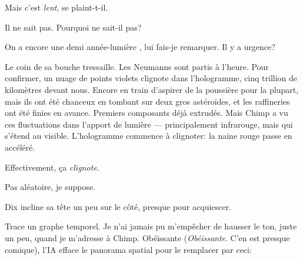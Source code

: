 \og Mais c'est \emph{lent}\fg , se plaint-t-il.

Il ne sait pas. Pourquoi ne sait-il pas?

\og On a encore une demi année-lumière \fg , lui fais-je remarquer. \og Il y a urgence?\fg

Le coin de sa bouche tressaille. \og Les Neumanns sont partis à l'heure.\fg{} Pour confirmer, un nuage de points violets clignote dans l'hologramme, cinq trillion de kilomètres devant nous. \og Encore en train d'aspirer de la poussière pour la plupart, mais ils ont été chanceux en tombant sur deux gros astéroïdes, et les raffineries ont été finies en avance. Premiers composants déjà extrudés. Mais Chimp a vu ces fluctuations dans l'apport de lumière — principalement infrarouge, mais qui s'étend au visible.\fg{} L'hologramme commence à clignoter: la naine rouge passe en accéléré.

Effectivement, ça \emph{clignote}.

\og Pas aléatoire, je suppose.\fg

Dix incline sa tête un peu sur le côté, presque pour acquiescer. 

\og Trace un graphe temporel.\fg{} Je n'ai jamais pu m'empêcher de hausser le ton, juste un peu, quand je m'adresse à Chimp. Obéissante (\emph{Obéissante}. C'en est presque comique), l'IA efface le panorama spatial pour le remplacer par ceci:

